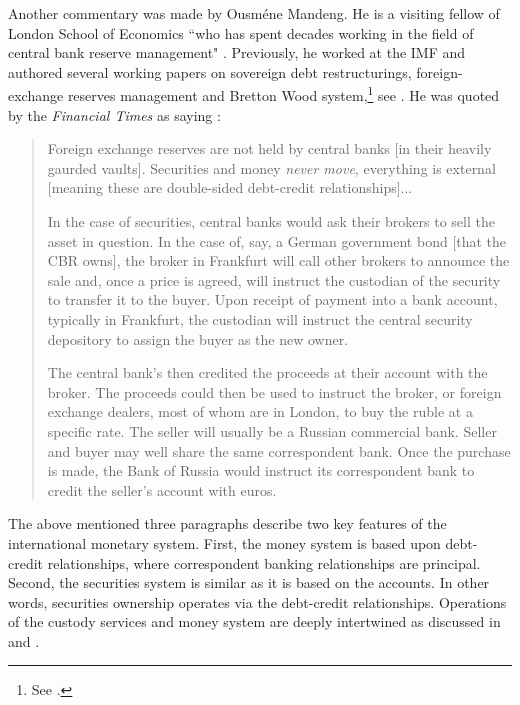 Another commentary was made by Ousm\'ene Mandeng.
He is a visiting fellow of London School of Economics ``who has spent decades working in the field of central bank reserve management" \citep{ft2022}. Previously, he worked at the IMF and authored several working papers on sovereign debt restructurings, foreign-exchange reserves management and Bretton Wood system,\footnote{ See \cite{brettonwood2016}.} see \cite{mandeng2003,mandeng2004,mandeng2016}. He was quoted by the \textit{Financial Times} as saying \citep[emphasis added, square brackets contain author's comments]{ft2022}:

\begin{quote}
Foreign exchange reserves are not held by central banks [in their heavily gaurded vaults]. Securities and money \textit{never move}, everything is external [meaning these are double-sided debt-credit relationships]... \par In the case of securities, central banks would ask their brokers to sell the asset in question. In the case of, say, a German government bond [that the CBR owns], the broker in Frankfurt will call other brokers to announce the sale and, once a price is agreed, will instruct the custodian of the security to transfer it to the buyer. Upon receipt of payment into a bank account, typically in Frankfurt, the custodian will instruct the central security depository to assign the buyer as the new owner.\par The central bank's then credited the proceeds at their account with the broker. The proceeds could then be used to instruct the broker, or foreign exchange dealers, most of whom are in London, to buy the ruble at a specific rate. The seller will usually be a Russian commercial bank. Seller and buyer may well share the same correspondent bank. Once the purchase is made, the Bank of Russia would instruct its correspondent bank to credit the seller's account with euros.
\end{quote}

The above mentioned three paragraphs describe two key features of the international monetary system. First, the money system is based upon debt-credit relationships, where correspondent banking relationships are principal. Second, the securities system is similar as it is based on the accounts. In other words, securities ownership operates via the debt-credit relationships.
Operations of the custody services and money system are deeply intertwined as discussed in \citep{occ2002} and \citep{gcastodian2023}.

